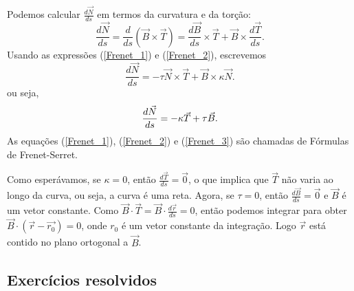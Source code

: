 Podemos calcular $\frac{d\vec{N}}{ds}$ em termos da curvatura e da torção:
\begin{equation*}
\frac{d\vec{N}}{ds}=\frac{d}{ds}\left(\vec{B}\times\vec{T}\right)=\frac{d\vec{B}}{ds}\times \vec{T}+\vec{B}\times\frac{d\vec{T}}{ds}.
\end{equation*}
Usando as expressões (\ref{Frenet_1}) e (\ref{Frenet_2}), escrevemos
\begin{equation*}
\frac{d\vec{N}}{ds}=-\tau\vec{N} \times \vec{T}+\vec{B}\times \kappa \vec{N}.
\end{equation*}
ou seja,
\begin{equation}{\label{Frenet_3}}
\frac{d\vec{N}}{ds}=-\kappa \vec{T}+\tau \vec{B}.
\end{equation}
As equações (\ref{Frenet_1}), (\ref{Frenet_2}) e (\ref{Frenet_3}) são chamadas de Fórmulas de Frenet-Serret.

Como esperávamos, se $\kappa=0$, então $\frac{d\vec{T}}{ds}=\vec{0}$, o que implica que $\vec{T}$ não varia ao longo da curva, ou seja, a curva é uma reta. Agora, se $\tau=0$, então $\frac{d\vec{B}}{ds}=\vec{0}$ e $\vec{B}$ é um vetor constante. Como $\vec{B}\cdot \vec{T}=\vec{B}\cdot \frac{d\vec{r}}{ds}=0$, então podemos integrar para obter $\vec{B}\cdot (\vec{r}-\vec{r_0})=0$, onde $r_0$ é um vetor constante da integração. Logo $\vec{r}$ está contido no plano ortogonal a $\vec{B}$.

\subsection*{Exercícios resolvidos}

